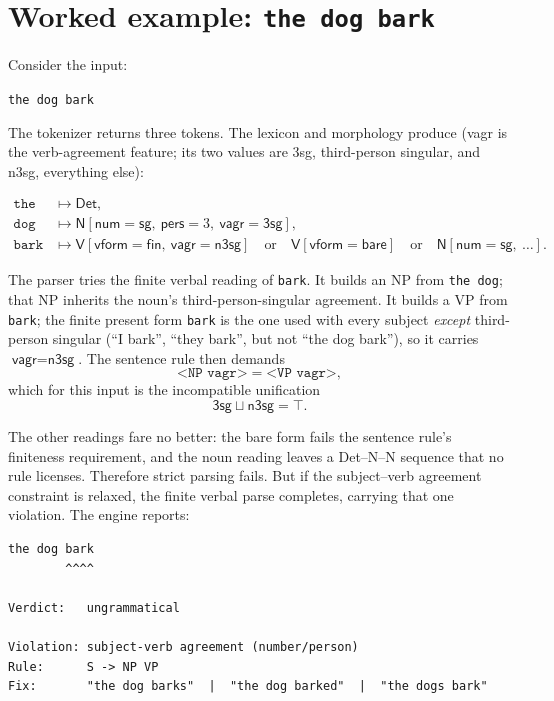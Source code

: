 \documentclass[11pt]{article}
\theoremstyle{definition}
\theoremstyle{plain}
\theoremstyle{remark}
\begin{document}
\section{Worked example: \texttt{the dog bark}}
\label{sec:example}

Consider the input:

\begin{center}
\texttt{the dog bark}
\end{center}

The tokenizer returns three tokens. The lexicon and morphology produce
(\textsf{vagr} is the verb-agreement feature; its two values are \textsf{3sg},
third-person singular, and \textsf{n3sg}, everything else):

\begin{align*}
  \texttt{the} &\mapsto \textsf{Det}, \\
  \texttt{dog} &\mapsto \textsf{N}[\textsf{num}=\textsf{sg},\ \textsf{pers}=3,\ \textsf{vagr}=\textsf{3sg}], \\
  \texttt{bark} &\mapsto
      \textsf{V}[\textsf{vform}=\textsf{fin},\ \textsf{vagr}=\textsf{n3sg}]
      \quad\text{or}\quad
      \textsf{V}[\textsf{vform}=\textsf{bare}]
      \quad\text{or}\quad
      \textsf{N}[\textsf{num}=\textsf{sg},\ \ldots].
\end{align*}

The parser tries the finite verbal reading of \texttt{bark}. It builds an NP from
\texttt{the dog}; that NP inherits the noun's third-person-singular agreement. It
builds a VP from \texttt{bark}; the finite present form \texttt{bark} is the one
used with every subject \emph{except} third-person singular (``I bark'', ``they
bark'', but not ``the dog bark''), so it carries $\textsf{vagr}=\textsf{n3sg}$.
The sentence rule then demands
\[
  \texttt{<NP vagr>} = \texttt{<VP vagr>},
\]
which for this input is the incompatible unification
\[
  \textsf{3sg} \sqcup \textsf{n3sg} = \top.
\]

The other readings fare no better: the bare form fails the sentence rule's
finiteness requirement, and the noun reading leaves a Det--N--N sequence that no
rule licenses. Therefore strict parsing fails. But if the subject--verb
agreement constraint is relaxed, the finite verbal parse completes, carrying
that one violation. The engine reports:

\begin{lstlisting}
the dog bark
        ^^^^

Verdict:   ungrammatical

Violation: subject-verb agreement (number/person)
Rule:      S -> NP VP
Fix:       "the dog barks"  |  "the dog barked"  |  "the dogs bark"
\end{lstlisting}
\end{document}
